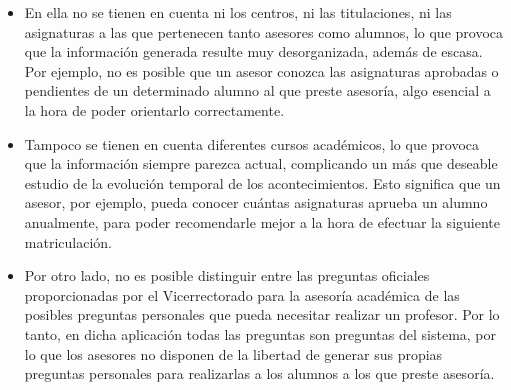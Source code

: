 \begin{itemize}
 \item En ella no se tienen en cuenta ni los centros, ni las titulaciones, ni
       las asignaturas a las que pertenecen tanto asesores como alumnos, lo que
       provoca que la información generada resulte muy desorganizada, además de
       escasa. Por ejemplo, no es posible que un asesor conozca las asignaturas
       aprobadas o pendientes de un determinado alumno al que preste asesoría,
       algo esencial a la hora de poder orientarlo correctamente.
 \item Tampoco se tienen en cuenta diferentes cursos académicos, lo que provoca
       que la información siempre parezca actual, complicando un más que
       deseable estudio de la evolución temporal de los acontecimientos. Esto
       significa que un asesor, por ejemplo, pueda conocer cuántas asignaturas
       aprueba un alumno anualmente, para poder recomendarle mejor a la hora
       de efectuar la siguiente matriculación.
 \item Por otro lado, no es posible distinguir entre las preguntas oficiales
       proporcionadas por el Vicerrectorado para la asesoría académica de las
       posibles preguntas personales que pueda necesitar realizar un profesor.
       Por lo tanto, en dicha aplicación todas las preguntas son preguntas del
       sistema, por lo que los asesores no disponen de la libertad de generar
       sus propias preguntas personales para realizarlas a los alumnos a los que
       preste asesoría.
\end{itemize}